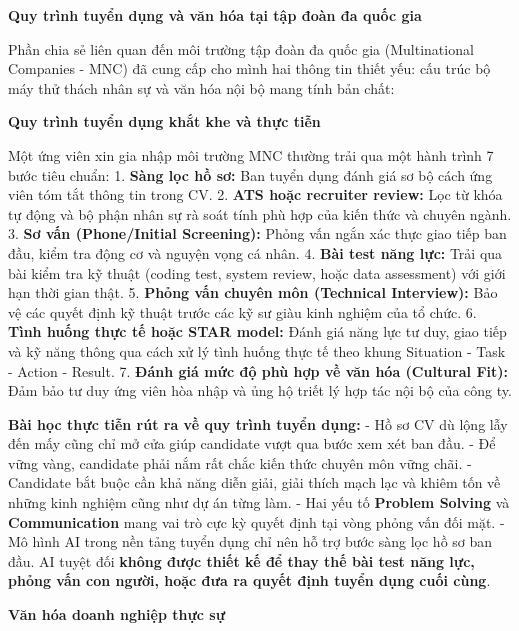 \vspace{0.5em}\noindent\textbf{Quy trình tuyển dụng và văn hóa tại tập đoàn đa quốc
gia}\par

Phần chia sẻ liên quan đến môi trường tập đoàn đa quốc gia
(Multinational Companies - MNC) đã cung cấp cho mình hai thông tin thiết
yếu: cấu trúc bộ máy thử thách nhân sự và văn hóa nội bộ mang tính bản
chất:

\vspace{0.5em}\noindent\textbf{Quy trình tuyển dụng khắt khe và thực
tiễn}\par

Một ứng viên xin gia nhập môi trường MNC thường trải qua một hành trình
7 bước tiêu chuẩn: 1. \textbf{Sàng lọc hồ sơ:} Ban tuyển dụng đánh giá
sơ bộ cách ứng viên tóm tắt thông tin trong CV. 2. \textbf{ATS hoặc
recruiter review:} Lọc từ khóa tự động và bộ phận nhân sự rà soát tính
phù hợp của kiến thức và chuyên ngành. 3. \textbf{Sơ vấn (Phone/Initial
Screening):} Phỏng vấn ngắn xác thực giao tiếp ban đầu, kiểm tra động cơ
và nguyện vọng cá nhân. 4. \textbf{Bài test năng lực:} Trải qua bài kiểm
tra kỹ thuật (coding test, system review, hoặc data assessment) với giới
hạn thời gian thật. 5. \textbf{Phỏng vấn chuyên môn (Technical
Interview):} Bảo vệ các quyết định kỹ thuật trước các kỹ sư giàu kinh
nghiệm của tổ chức. 6. \textbf{Tình huống thực tế hoặc STAR model:} Đánh
giá năng lực tư duy, giao tiếp và kỹ năng thông qua cách xử lý tình
huống thực tế theo khung Situation - Task - Action - Result. 7.
\textbf{Đánh giá mức độ phù hợp về văn hóa (Cultural Fit):} Đảm bảo tư
duy ứng viên hòa nhập và ủng hộ triết lý hợp tác nội bộ của công ty.

\textbf{Bài học thực tiễn rút ra về quy trình tuyển dụng:} - Hồ sơ CV dù
lộng lẫy đến mấy cũng chỉ mở cửa giúp candidate vượt qua bước xem xét
ban đầu. - Để vững vàng, candidate phải nắm rất chắc kiến thức chuyên
môn vững chãi. - Candidate bắt buộc cần khả năng diễn giải, giải thích
mạch lạc và khiêm tốn về những kinh nghiệm cũng như dự án từng làm. -
Hai yếu tố \textbf{Problem Solving} và \textbf{Communication} mang vai
trò cực kỳ quyết định tại vòng phỏng vấn đối mặt. - Mô hình AI trong nền
tảng tuyển dụng chỉ nên hỗ trợ bước sàng lọc hồ sơ ban đầu. AI tuyệt đối
\textbf{không được thiết kế để thay thế bài test năng lực, phỏng vấn con
người, hoặc đưa ra quyết định tuyển dụng cuối cùng}.

\vspace{0.5em}\noindent\textbf{Văn hóa doanh nghiệp thực
sự}\par


